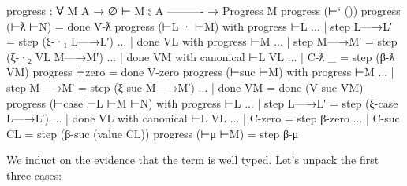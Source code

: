 \begin{fence}
\begin{code}
progress : ∀ {M A}
  → ∅ ⊢ M ⦂ A
    ----------
  → Progress M
progress (⊢` ())
progress (⊢ƛ ⊢N)                            =  done V-ƛ
progress (⊢L · ⊢M) with progress ⊢L
... | step L—→L′                            =  step (ξ-·₁ L—→L′)
... | done VL with progress ⊢M
...   | step M—→M′                          =  step (ξ-·₂ VL M—→M′)
...   | done VM with canonical ⊢L VL
...     | C-ƛ _                             =  step (β-ƛ VM)
progress ⊢zero                              =  done V-zero
progress (⊢suc ⊢M) with progress ⊢M
...  | step M—→M′                           =  step (ξ-suc M—→M′)
...  | done VM                              =  done (V-suc VM)
progress (⊢case ⊢L ⊢M ⊢N) with progress ⊢L
... | step L—→L′                            =  step (ξ-case L—→L′)
... | done VL with canonical ⊢L VL
...   | C-zero                              =  step β-zero
...   | C-suc CL                            =  step (β-suc (value CL))
progress (⊢μ ⊢M)                            =  step β-μ
\end{code}
\end{fence}

We induct on the evidence that the term is well typed. Let's unpack the
first three cases:

